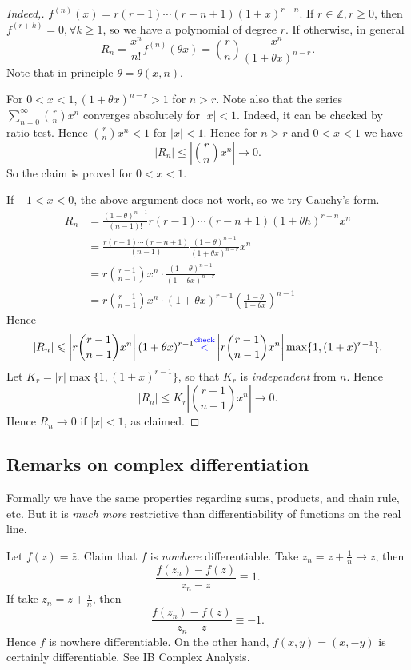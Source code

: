 \begin{proof}[Indeed,]
    $ f^{(n)}(x) = r(r-1)\cdots (r-n+1)(1+x)^{r-n} $. If $ r\in \mathbb{Z},r\ge 0 $, then $ f^{(r+k)}=0,\forall k\ge 1 $, so we have a polynomial of degree $r$. If otherwise, in general
    \[
        R_n = \frac{x^n}{n!}f^{(n)}(\theta x) = \binom{r}{n}\frac{x^n}{(1+\theta x)^{n-r}}.
    \]
    Note that in principle $ \theta=\theta(x,n) $. 
    
    For $ 0<x<1, (1+\theta x)^{n-r}>1 $ for $n>r$. Note also that the series $ \sum_{n=0}^{\infty}\binom{r}{n}x^n $ converges absolutely for $ |x|<1 $. Indeed, it can be checked by ratio test. Hence $ \binom{r}{n}x^n<1 $ for $ |x|<1 $. Hence for $n>r$ and $0<x<1$ we have 
    \[
        |R_n|\le \left| \binom{r}{n}x^n \right|\to 0. 
    \]
    So the claim is proved for $ 0<x<1 $.

    If $ -1<x<0 $, the above argument does not work, so we try Cauchy's form.
    \begin{align*}
        R_n &= \frac{(1-\theta)^{n-1}}{(n-1)!}r(r-1)\cdots (r-n+1)(1+\theta h)^{r-n}x^n\\ 
        &= \frac{r(r-1)\cdots (r-n+1)}{(n-1)}\frac{(1-\theta)^{n-1}}{(1+\theta x)^{n-r}}x^n\\ 
        &=  r \binom{r-1}{n-1}x^n \cdot \frac{(1-\theta)^{n-1}}{(1+\theta x)^{n-r}}\\ 
        &= r \binom{r-1}{n-1}x^n \cdot(1+\theta x)^{r-1}\left( \frac{1-\theta}{1+\theta x} \right)^{n-1}
    \end{align*}
    Hence
    \[
        \left| R_n \right| \le \left| r\binom{r-1}{n-1}x^n \right| (1+\theta x)^{r-1} {\color{blue}\overset{\text{check}}{<}}  \left| r\binom{r-1}{n-1}x^n \right| \max \{1,(1+x)^{r-1}\}.
    \]
    Let $ K_r = |r| \max \{1,(1+x)^{r-1}\} $, so that $K_r$ is \textit{independent} from $n$. Hence 
    \[
        |R_n|\le K_r \left| \binom{r-1}{n-1}x^n \right| \to 0.
    \]
    Hence $ R_n\to 0 $ if $|x|<1$, as claimed.
\end{proof}

\subsection{Remarks on complex differentiation}
Formally we have the same properties regarding sums, products, and chain rule, etc. But it is \textit{much more} restrictive than differentiability of functions on the real line.

\begin{example}
    Let $ f(z) = \bar{z} $. Claim that $f$ is \textit{nowhere} differentiable. Take $ z_n=z+\frac{1}{n}\to z $, then 
    \[
        \frac{f(z_n)-f(z)}{z_n-z}\equiv 1.
    \]
    If take $ z_n = z+\frac{i}{n} $, then 
    \[
        \frac{f(z_n)-f(z)}{z_n-z}\equiv -1.
    \]
    Hence $f$ is nowhere differentiable. On the other hand, $ f(x,y)= (x,-y) $ is certainly differentiable. See IB Complex Analysis.
\end{example}